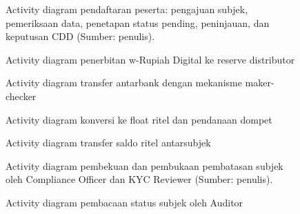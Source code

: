 

\begin{figure}[htbp]
\centering
\resizebox{\textwidth}{!}{}
\caption{Activity diagram pendaftaran peserta: pengajuan subjek, pemeriksaan data, penetapan status pending, peninjauan, dan keputusan CDD (Sumber: penulis).}
\label{fig:ch3-ad-01}
\end{figure}

\begin{figure}[htbp]
\centering
\resizebox{\textwidth}{!}{}
\caption{Activity diagram penerbitan w-Rupiah Digital ke reserve distributor}
\label{fig:ch3-ad-02}
\end{figure}

\begin{figure}[htbp]
\centering
\resizebox{\textwidth}{!}{}
\caption{Activity diagram transfer antarbank dengan mekanisme maker-checker}
\label{fig:ch3-ad-03a}
\end{figure}

\begin{figure}[htbp]
\centering
\resizebox{\textwidth}{!}{}
\caption{Activity diagram konversi ke float ritel dan pendanaan dompet}
\label{fig:ch3-ad-03b}
\end{figure}

\begin{figure}[p]
\centering
\resizebox{\textwidth}{!}{}
\caption{Activity diagram transfer saldo ritel antarsubjek}
\label{fig:ch3-ad-04}
\end{figure}

\begin{figure}[htbp]
\centering
\resizebox{\textwidth}{!}{}
\caption{Activity diagram pembekuan dan pembukaan pembatasan subjek oleh Compliance Officer dan KYC Reviewer (Sumber: penulis).}
\label{fig:ch3-ad-05}
\end{figure}

\begin{figure}[htbp]
\centering
\resizebox{\textwidth}{!}{}
\caption{Activity diagram pembacaan status subjek oleh Auditor}
\label{fig:ch3-ad-06}
\end{figure}

